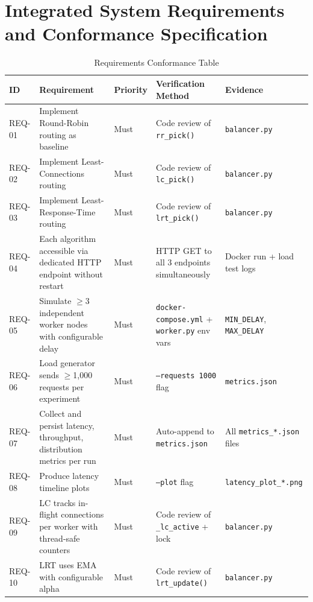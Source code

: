 \documentclass[conference]{IEEEtran}
\begin{document}
\section{Integrated System Requirements and Conformance Specification}

\begin{table}[t]
  \centering
  \caption{Requirements Conformance Table}
  \begin{tabular}{p{0.8cm}p{5.5cm}p{1.5cm}p{3.5cm}p{3.5cm}}
    \toprule
    \textbf{ID} & \textbf{Requirement} & \textbf{Priority} & \textbf{Verification Method} & \textbf{Evidence} \\
    \midrule
    REQ-01 & Implement Round-Robin routing as baseline & Must & Code review of \texttt{rr\_pick()} & \texttt{balancer.py} \\
    REQ-02 & Implement Least-Connections routing & Must & Code review of \texttt{lc\_pick()} & \texttt{balancer.py} \\
    REQ-03 & Implement Least-Response-Time routing & Must & Code review of \texttt{lrt\_pick()} & \texttt{balancer.py} \\
    REQ-04 & Each algorithm accessible via dedicated HTTP endpoint without restart & Must & HTTP GET to all 3 endpoints simultaneously & Docker run + load test logs \\
    REQ-05 & Simulate $\geq$3 independent worker nodes with configurable delay & Must & \texttt{docker-compose.yml} + \texttt{worker.py} env vars & \texttt{MIN\_DELAY}, \texttt{MAX\_DELAY} \\
    REQ-06 & Load generator sends $\geq$1,000 requests per experiment & Must & \texttt{--requests 1000} flag & \texttt{metrics.json} \\
    REQ-07 & Collect and persist latency, throughput, distribution metrics per run & Must & Auto-append to \texttt{metrics.json} & All \texttt{metrics\_*.json} files \\
    REQ-08 & Produce latency timeline plots & Must & \texttt{--plot} flag & \texttt{latency\_plot\_*.png} \\
    REQ-09 & LC tracks in-flight connections per worker with thread-safe counters & Must & Code review of \texttt{\_lc\_active} + lock & \texttt{balancer.py} \\
    REQ-10 & LRT uses EMA with configurable alpha & Must & Code review of \texttt{lrt\_update()} & \texttt{balancer.py} \\

\end{tabular}
\end{table}
\end{document}
